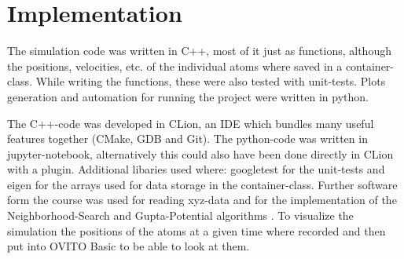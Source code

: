 \chapter{Implementation}
\begin{comment}	
	go about structure of the code 
	-> describe Code structure
		
	-> c++ was used to implement the code (mostly functional)
	-> key atoms container Class which holdes all the Values
	-> most functions were tested with googleTest
\end{comment}

\begin{comment}
code written in c++ most of it pretty functional, classes just used 
for the atoms container which holds the arrays 
while writing it also wrote the unittests with googletest
data aquiered form the code plotted with python
also where large simulations had to be run, called the program from the python code

\end{comment}
The simulation code was written in C++, most of it just as functions, although the positions, velocities, etc. of the individual atoms where saved in a container-class.
While writing the functions, these were also tested with unit-tests.
Plots generation and automation for running the project were written in python.

\begin{comment}
developed in CLion which as an integrated git inviroment
Clion builds with Cmake then clang as a compiler
debugger is gdb(nicely hidden)
- additianal bibs where :
	googletest	for unittests
	eigen		for arrays 
- software used form the class itself 
- ovito for visualization
\end{comment}
The C++-code was developed in CLion, an IDE which bundles many useful features together (CMake, GDB and Git).
The python-code was written in jupyter-notebook, alternatively this could also have been done directly in CLion with a plugin. 
Additional libaries used where: googletest \cite{googletest} for the unit-tests and eigen \cite{eigen} for the arrays used for data storage in the container-class. 
Further software form the course was used for reading xyz-data and for the implementation of the Neighborhood-Search and Gupta-Potential algorithms \cite{molDymCourse}. 
To visualize the simulation the positions of the atoms at a given time where recorded and then put into OVITO Basic \cite{ovito} to be able to look at them.
\begin{comment}
--
code is structured into the milestones, so an individual milestone can be rerun in case of fuckup
parted into h and cpp files as usual
followed the structure of the milestone
\end{comment}

